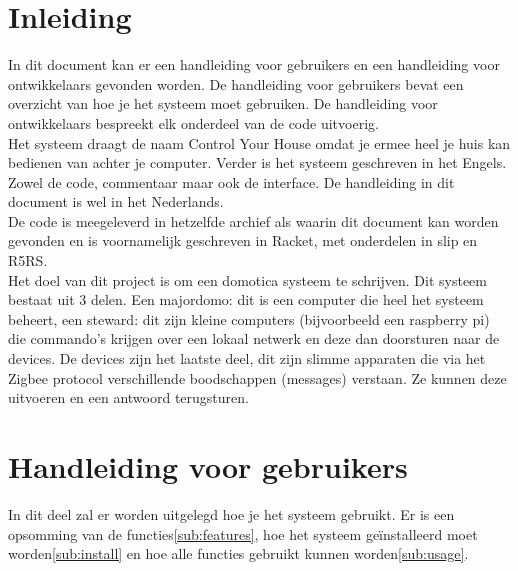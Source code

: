 \documentclass{article}
\begin{document}
\section{Inleiding}\label{inleiding}
In dit document kan er een handleiding voor gebruikers en een handleiding voor ontwikkelaars gevonden worden. De handleiding voor gebruikers bevat een overzicht van hoe je het systeem moet gebruiken. De handleiding voor ontwikkelaars bespreekt elk onderdeel van de code uitvoerig.\\
Het systeem draagt de naam Control Your House omdat je ermee heel je huis kan bedienen van achter je computer. Verder is het systeem geschreven in het Engels. Zowel de code, commentaar maar ook de interface. De handleiding in dit document is wel in het Nederlands.\\
De code is meegeleverd in hetzelfde archief als waarin dit document kan worden gevonden en is voornamelijk geschreven in Racket, met onderdelen in slip en R5RS.\\
Het doel van dit project is om een domotica systeem te schrijven. Dit systeem bestaat uit 3 delen. Een majordomo: dit is een computer die heel het systeem beheert, een steward: dit zijn kleine computers (bijvoorbeeld een raspberry pi) die commando's krijgen over een lokaal netwerk en deze dan doorsturen naar de devices. De devices zijn het laatste deel, dit zijn slimme apparaten die via het Zigbee protocol verschillende boodschappen (messages) verstaan. Ze kunnen deze uitvoeren en een antwoord terugsturen.\\

\section{Handleiding voor gebruikers}
\label{sec:users}
In dit deel zal er worden uitgelegd hoe je het systeem gebruikt. Er is een opsomming van de functies\ref{sub:features}, hoe het systeem ge\"{i}nstalleerd moet worden\ref{sub:install} en hoe alle functies gebruikt kunnen worden\ref{sub:usage}.
\end{document}
